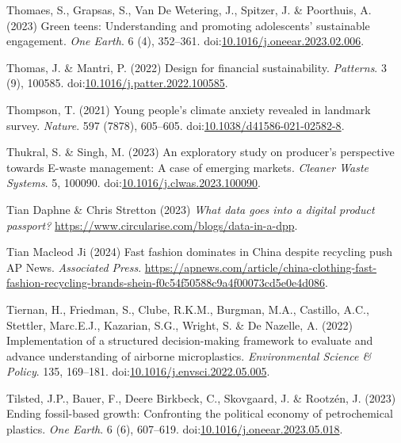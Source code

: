 \documentclass[
  letterpaper,
  DIV=11,
  numbers=noendperiod]{scrartcl}
\newlength{\cslhangindent}
\newenvironment{CSLReferences}[2] %
 {\begin{list}{}{%
  \setlength{\itemindent}{0pt}
  \setlength{\leftmargin}{0pt}
  \setlength{\parsep}{0pt}
  \ifodd #1
   \setlength{\leftmargin}{\cslhangindent}
   \setlength{\itemindent}{-1\cslhangindent}
  \fi
  \setlength{\itemsep}{#2\baselineskip}}}
 {\end{list}}
\begin{document}
\begin{CSLReferences}{0}{1}
Thomaes, S., Grapsas, S., Van De Wetering, J., Spitzer, J. \& Poorthuis,
A. (2023) Green teens: {Understanding} and promoting adolescents'
sustainable engagement. \emph{One Earth}. 6 (4), 352--361.
doi:\href{https://doi.org/10.1016/j.oneear.2023.02.006}{10.1016/j.oneear.2023.02.006}.

Thomas, J. \& Mantri, P. (2022) Design for financial sustainability.
\emph{Patterns}. 3 (9), 100585.
doi:\href{https://doi.org/10.1016/j.patter.2022.100585}{10.1016/j.patter.2022.100585}.

Thompson, T. (2021) Young people's climate anxiety revealed in landmark
survey. \emph{Nature}. 597 (7878), 605--605.
doi:\href{https://doi.org/10.1038/d41586-021-02582-8}{10.1038/d41586-021-02582-8}.

Thukral, S. \& Singh, M. (2023) An exploratory study on producer's
perspective towards {E-waste} management: {A} case of emerging markets.
\emph{Cleaner Waste Systems}. 5, 100090.
doi:\href{https://doi.org/10.1016/j.clwas.2023.100090}{10.1016/j.clwas.2023.100090}.

Tian Daphne \& Chris Stretton (2023) \emph{What data goes into a digital
product passport?}
\url{https://www.circularise.com/blogs/data-in-a-dpp}.

Tian Macleod Ji (2024) Fast fashion dominates in {China} despite
recycling push {\textbar} {AP News}. \emph{Associated Press}.
\url{https://apnews.com/article/china-clothing-fast-fashion-recycling-brands-shein-f0c54f50588c9a4f00073cd5e0e4d086}.

Tiernan, H., Friedman, S., Clube, R.K.M., Burgman, M.A., Castillo, A.C.,
Stettler, Marc.E.J., Kazarian, S.G., Wright, S. \& De Nazelle, A. (2022)
Implementation of a structured decision-making framework to evaluate and
advance understanding of airborne microplastics. \emph{Environmental
Science \& Policy}. 135, 169--181.
doi:\href{https://doi.org/10.1016/j.envsci.2022.05.005}{10.1016/j.envsci.2022.05.005}.

Tilsted, J.P., Bauer, F., Deere Birkbeck, C., Skovgaard, J. \& Rootzén,
J. (2023) Ending fossil-based growth: {Confronting} the political
economy of petrochemical plastics. \emph{One Earth}. 6 (6), 607--619.
doi:\href{https://doi.org/10.1016/j.oneear.2023.05.018}{10.1016/j.oneear.2023.05.018}.


\end{CSLReferences}
\end{document}
